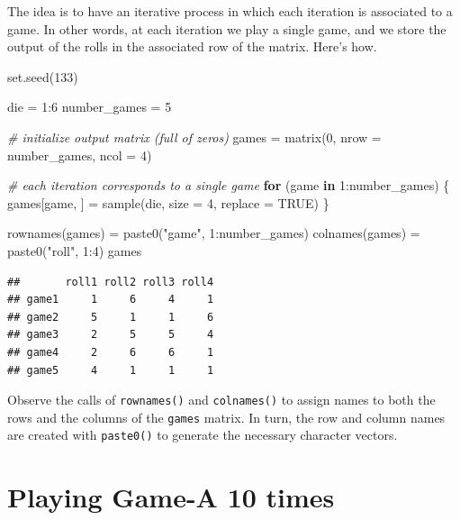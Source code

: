 \documentclass[
]{book}
\newenvironment{Shaded}{\begin{snugshade}}{\end{snugshade}}
\newcommand{\AttributeTok}[1]{\textcolor[rgb]{0.77,0.63,0.00}{#1}}
\newcommand{\CommentTok}[1]{\textcolor[rgb]{0.56,0.35,0.01}{\textit{#1}}}
\newcommand{\ConstantTok}[1]{\textcolor[rgb]{0.00,0.00,0.00}{#1}}
\newcommand{\ControlFlowTok}[1]{\textcolor[rgb]{0.13,0.29,0.53}{\textbf{#1}}}
\newcommand{\DecValTok}[1]{\textcolor[rgb]{0.00,0.00,0.81}{#1}}
\newcommand{\FunctionTok}[1]{\textcolor[rgb]{0.00,0.00,0.00}{#1}}
\newcommand{\NormalTok}[1]{#1}
\newcommand{\OtherTok}[1]{\textcolor[rgb]{0.56,0.35,0.01}{#1}}
\newcommand{\SpecialCharTok}[1]{\textcolor[rgb]{0.00,0.00,0.00}{#1}}
\newcommand{\StringTok}[1]{\textcolor[rgb]{0.31,0.60,0.02}{#1}}
\begin{document}
The idea is to have an iterative process in which each iteration is associated
to a game. In other words, at each iteration we play a single game, and we
store the output of the rolls in the associated row of the matrix. Here's how.

\begin{Shaded}
\begin{Highlighting}[]
\FunctionTok{set.seed}\NormalTok{(}\DecValTok{133}\NormalTok{)}

\NormalTok{die }\OtherTok{=} \DecValTok{1}\SpecialCharTok{:}\DecValTok{6}
\NormalTok{number\_games }\OtherTok{=} \DecValTok{5}

\CommentTok{\# initialize output matrix (full of zeros)}
\NormalTok{games }\OtherTok{=} \FunctionTok{matrix}\NormalTok{(}\DecValTok{0}\NormalTok{, }\AttributeTok{nrow =}\NormalTok{ number\_games, }\AttributeTok{ncol =} \DecValTok{4}\NormalTok{)}

\CommentTok{\# each iteration corresponds to a single game}
\ControlFlowTok{for}\NormalTok{ (game }\ControlFlowTok{in} \DecValTok{1}\SpecialCharTok{:}\NormalTok{number\_games) \{}
\NormalTok{  games[game, ] }\OtherTok{=} \FunctionTok{sample}\NormalTok{(die, }\AttributeTok{size =} \DecValTok{4}\NormalTok{, }\AttributeTok{replace =} \ConstantTok{TRUE}\NormalTok{)}
\NormalTok{\}}

\FunctionTok{rownames}\NormalTok{(games) }\OtherTok{=} \FunctionTok{paste0}\NormalTok{(}\StringTok{"game"}\NormalTok{, }\DecValTok{1}\SpecialCharTok{:}\NormalTok{number\_games)}
\FunctionTok{colnames}\NormalTok{(games) }\OtherTok{=} \FunctionTok{paste0}\NormalTok{(}\StringTok{"roll"}\NormalTok{, }\DecValTok{1}\SpecialCharTok{:}\DecValTok{4}\NormalTok{)}
\NormalTok{games}
\end{Highlighting}
\end{Shaded}

\begin{verbatim}
##       roll1 roll2 roll3 roll4
## game1     1     6     4     1
## game2     5     1     1     6
## game3     2     5     5     4
## game4     2     6     6     1
## game5     4     1     1     1
\end{verbatim}

Observe the calls of \texttt{rownames()} and \texttt{colnames()} to assign names to both the
rows and the columns of the \texttt{games} matrix. In turn, the row and column names
are created with \texttt{paste0()} to generate the necessary character vectors.

\hypertarget{playing-game-a-10-times}{%
\section{Playing Game-A 10 times}\label{playing-game-a-10-times}}
\end{document}
